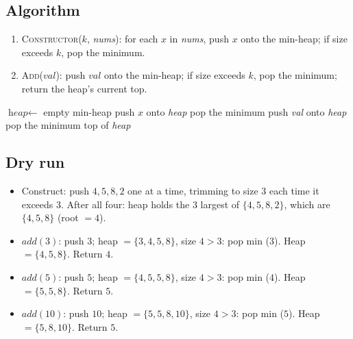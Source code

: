 \subsection*{Algorithm}

\begin{enumerate}
  \item \textsc{Constructor}($k$, \textit{nums}): for each $x$ in
        \textit{nums}, push $x$ onto the min-heap; if size exceeds $k$,
        pop the minimum.
  \item \textsc{Add}($\textit{val}$): push $\textit{val}$ onto the
        min-heap; if size exceeds $k$, pop the minimum; return the
        heap's current top.
\end{enumerate}

\begin{algorithm}[H]
\caption{Kth Largest Element in a Stream}
\begin{algorithmic}[1]
  \State $\textit{heap} \gets$ empty min-heap
    \State push $x$ onto \textit{heap}
     pop the minimum \EndIf
  \EndFor
\EndProcedure
{}
  \State push \textit{val} onto \textit{heap}
   pop the minimum \EndIf
  \State \Return top of \textit{heap}
\EndProcedure
\end{algorithmic}
\end{algorithm}

\subsection*{Dry run}


\begin{itemize}
  \item Construct: push $4,5,8,2$ one at a time, trimming to size $3$
        each time it exceeds $3$. After all four: heap holds the $3$
        largest of $\{4,5,8,2\}$, which are $\{4,5,8\}$ (root $=4$).
  \item $\textit{add}(3)$: push $3$; heap $=\{3,4,5,8\}$, size $4>3$:
        pop min ($3$). Heap $=\{4,5,8\}$. Return $4$.
  \item $\textit{add}(5)$: push $5$; heap $=\{4,5,5,8\}$, size $4>3$:
        pop min ($4$). Heap $=\{5,5,8\}$. Return $5$.
  \item $\textit{add}(10)$: push $10$; heap $=\{5,5,8,10\}$, size $4>3$:
        pop min ($5$). Heap $=\{5,8,10\}$. Return $5$.
\end{itemize}


